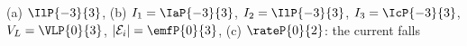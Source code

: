 (a) $\IlP{-3}{3}$, (b) $I_1 = \IaP{-3}{3}$, $I_2 = \IlP{-3}{3}$, $I_3 = \IcP{-3}{3}$, $V_L = \VLP{0}{3}$, $|\mathcal{E}_i| = \emfP{0}{3}$, (c) $\rateP{0}{2}$: the current falls
